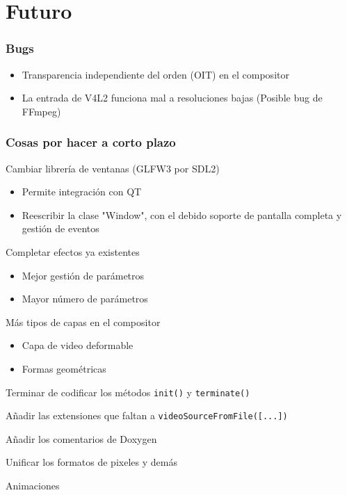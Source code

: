 \documentclass{beamer}
\begin{document}
%
%
\section{Futuro}

\begin{frame} \frametitle{Bugs}
	\begin{itemize}
		\item{Transparencia independiente del orden (OIT) en el compositor}
		\item{La entrada de V4L2 funciona mal a resoluciones bajas (Posible bug de FFmpeg)}
	\end{itemize}
\end{frame}

\begin{frame}[t] \frametitle{Cosas por hacer a corto plazo}
	\begin{itemize}
		\begin{item}
			Cambiar librería de ventanas (GLFW3 por SDL2)
			\begin{itemize}
				\item{Permite integración con QT}
				\item{Reescribir la clase "Window", con el debido soporte de pantalla completa y gestión de eventos}
			\end{itemize}
		\end{item}
		\begin{item}
			Completar efectos ya existentes
			\begin{itemize}
				\item{Mejor gestión de parámetros}
				\item{Mayor número de parámetros}
			\end{itemize}
		\end{item}
		\begin{item}
			Más tipos de capas en el compositor
			\begin{itemize}
				\item{Capa de video deformable}
				\item{Formas geométricas}
			\end{itemize}
		\end{item}
		\begin{item}
			Terminar de codificar los métodos \texttt{init()} y \texttt{terminate()}
		\end{item}
		\begin{item}
			Añadir las extensiones que faltan a \texttt{videoSourceFromFile([...])}
		\end{item}
		\begin{item}
			Añadir los comentarios de Doxygen
		\end{item}
		\begin{item}
			Unificar los formatos de pixeles y demás
		\end{item}
		\begin{item}
			Animaciones
		\end{item}
	\end{itemize}
\end{frame}
\end{document}
